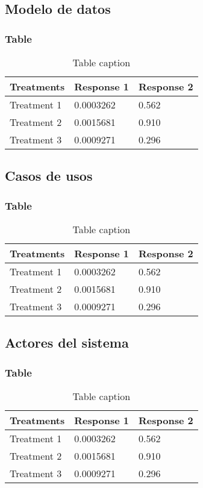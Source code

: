 \documentclass{beamer}
\begin{document}
\subsection{Modelo de datos} 
\begin{frame}
\frametitle{Table}
\begin{table}
\begin{tabular}{l l l}
\toprule
\textbf{Treatments} & \textbf{Response 1} & \textbf{Response 2}\\
\midrule
Treatment 1 & 0.0003262 & 0.562 \\
Treatment 2 & 0.0015681 & 0.910 \\
Treatment 3 & 0.0009271 & 0.296 \\
\bottomrule
\end{tabular}
\caption{Table caption}
\end{table}
\end{frame}

\subsection{Casos de usos} 
\begin{frame}
\frametitle{Table}
\begin{table}
\begin{tabular}{l l l}
\toprule
\textbf{Treatments} & \textbf{Response 1} & \textbf{Response 2}\\
\midrule
Treatment 1 & 0.0003262 & 0.562 \\
Treatment 2 & 0.0015681 & 0.910 \\
Treatment 3 & 0.0009271 & 0.296 \\
\bottomrule
\end{tabular}
\caption{Table caption}
\end{table}
\end{frame}

\subsection{Actores del sistema} 
\begin{frame}
\frametitle{Table}
\begin{table}
\begin{tabular}{l l l}
\toprule
\textbf{Treatments} & \textbf{Response 1} & \textbf{Response 2}\\
\midrule
Treatment 1 & 0.0003262 & 0.562 \\
Treatment 2 & 0.0015681 & 0.910 \\
Treatment 3 & 0.0009271 & 0.296 \\
\bottomrule
\end{tabular}
\caption{Table caption}
\end{table}
\end{frame}
\end{document}
